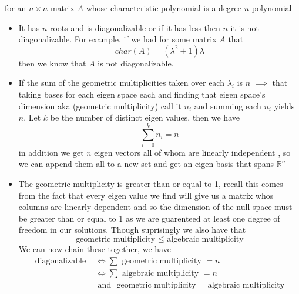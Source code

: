 \documentclass[11pt]{book}
\begin{document}
\begin{thm}\label{thm:algebraic_and_geometric_connection_to_roots_and_eigen_basis_}
    for an $n\times n$ matrix $A$ whose characteristic polynomial is a degree $n$ polynomial 
    \begin{itemize}
        \item It has $n$ roots and is diagonalizable or if it has less then $n$ it is not diagonalizable. For example, if we had for some matrix $A$ that
            \[
                char\left(A\right) = \left( \lambda ^2  + 1 \right) \lambda 
            \]
            then we know that $A$ is not diagonalizable.
        \item If the sum of the geometric multiplicities taken over each $\lambda _{i} $ is $n$ $ \implies $ that taking bases for each eigen space each and finding that eigen space's dimension  aka (geometric multiplicity) call it $n_{i} $  and summing each $n_{i} $ yields $n$. Let $k$ be the number of distinct eigen values, then we have
            \[
            \sum_{i=0}^{k}  n_{i} = n
            \]
            in addition we get $n$ eigen vectors all of whom are linearly independent , so we can append them all to a new set and get an eigen basis that spans $\mathbb{R} ^{n} $ 
        \item The geometric multiplicity is greater than or equal to 1, recall this comes from the fact that every eigen value we find will give us a matrix whos columns are linearly dependent and so the dimension of the null space must be greater than or equal to 1 as we are guarenteed at least one degree of freedom in our solutions. Though suprisingly we also have that  
            \[
            \text{ geometric multiplicity  } \le \text{ algebraic multiplicity  } 
            \]
        We can now chain these together, we have  
        \begin{align*}
            \text{ diagonalizable  } &\Leftrightarrow \sum \text{ geometric multiplicity  } = n \\
            &\Leftrightarrow \sum \text{ algebraic multiplicity  } = n \\
            &\text{ and } \text{ geometric multiplicity  } = \text{ algebraic multiplicity  } 
        \end{align*}
    \end{itemize}
\end{thm}
\end{document}
